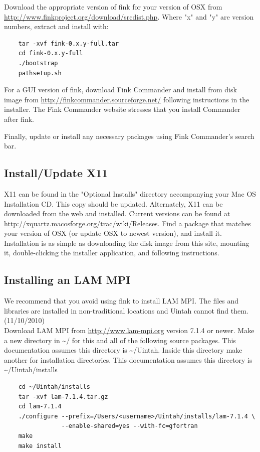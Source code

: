 \documentclass[12pt]{article}
\begin{document}
Download the appropriate version of fink for your version of OSX from
\url{http://www.finkproject.org/download/srcdist.php}.  Where "x" and
"y" are version numbers, extract and install with:

\begin{verbatim}
	tar -xvf fink-0.x.y-full.tar 
	cd fink-0.x.y-full
	./bootstrap 
	pathsetup.sh
\end{verbatim}

For a GUI version of fink, download Fink Commander and install from
disk image from \url{http://finkcommander.sourceforge.net/} following
instructions in the installer.  The Fink Commander website stresses
that you install Commander after fink.

Finally, update or install any necessary packages using Fink
Commander's search bar.

\subsection{Install/Update X11}
X11 can be found in the "Optional Installs" directory accompanying
your Mac OS Installation CD.  This copy should be updated.
Alternately, X11 can be downloaded from the web and installed.
Current versions can be found at
\url{http://xquartz.macosforge.org/trac/wiki/Releases}.  Find a
package that matches your version of OSX (or update OSX to newest
version), and install it.  Installation is as simple as downloading
the disk image from this site, mounting it, double-clicking the
installer application, and following instructions.

\subsection{Installing an LAM MPI}
We recommend that you avoid using fink to install LAM MPI.
The files and libraries are installed in non-traditional locations 
and Uintah cannot find them. (11/10/2010) \\

Download LAM MPI from \url{http://www.lam-mpi.org}
version 7.1.4 or newer.  Make a new directory in \textasciitilde/ for
this and all of the following source packages.  This documentation
assumes this directory is \textasciitilde/Uintah.  Inside this
directory make another for installation directories.  This
documentation assumes this directory is
\textasciitilde/Uintah/installs

\begin{verbatim}
	cd ~/Uintah/installs
	tar -xvf lam-7.1.4.tar.gz
	cd lam-7.1.4
	./configure --prefix=/Users/<username>/Uintah/installs/lam-7.1.4 \
	            --enable-shared=yes --with-fc=gfortran
	make
	make install
\end{verbatim}
\end{document}
